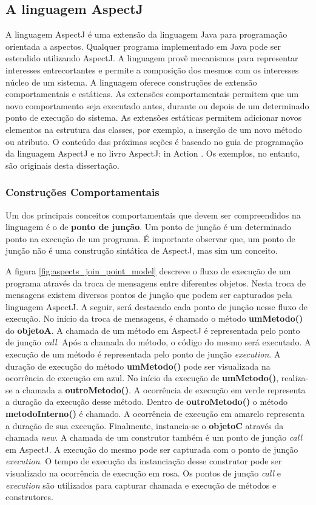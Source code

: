 \subsection{A linguagem AspectJ}

A linguagem AspectJ \cite{AspectJ11} é uma extensão da linguagem Java para programação orientada a aspectos. Qualquer programa implementado em Java
pode ser estendido utilizando AspectJ. A linguagem provê mecanismos para representar interesses entrecortantes e permite a composição dos mesmos com os interesses 
núcleo de um sistema. A linguagem oferece construções de extensão comportamentais e estáticas. As extensões comportamentais permitem que um novo
comportamento seja executado antes, durante ou depois de um determinado ponto de execução do sistema. As extensões estáticas permitem adicionar novos elementos na
estrutura das classes, por exemplo, a inserção de um novo método ou atributo. O conteúdo das próximas seções é baseado no guia de programação da
linguagem AspectJ \cite{aspectjguide} e no livro AspectJ: in Action \cite{Laddad:2003:AAP:993468}. Os exemplos, no entanto, são originais desta
dissertação.

\subsubsection{Construções Comportamentais}

Um dos principais conceitos comportamentais que devem ser compreendidos na linguagem é o de \textbf{ponto de junção}. Um ponto de junção é um
determinado ponto na execução de um programa. É importante observar que, um ponto de junção não é uma construção sintática de AspectJ, mas sim um conceito. 

A figura \ref{fig:aspects_join_point_model} descreve o fluxo de execução de um programa através da troca de mensagens entre diferentes objetos. Nesta
troca de mensagens existem diversos pontos de junção que podem ser capturados pela linguagem AspectJ. A seguir, será destacado cada ponto de junção
nesse fluxo de execução. No início da troca de mensagens, é chamado o método \textbf{umMetodo()} do \textbf{objetoA}. A chamada de um método em
AspectJ é representada pelo ponto de junção \textit{call}. Após a chamada do método, o código do mesmo será executado. A execução de um método é
representada pelo ponto de junção \textit{execution}. A duração de execução do método \textbf{umMetodo()} pode ser visualizada na ocorrência de
execução em azul. No início da execução de \textbf{umMetodo()}, realiza-se a chamada a \textbf{outroMetodo()}. A ocorrência de execução em verde
representa a duração da execução desse método. Dentro de \textbf{outroMetodo()} o método \textbf{metodoInterno()} é chamado. A ocorrência de execução em 
amarelo representa a duração de sua execução. Finalmente, instancia-se o \textbf{objetoC} através da chamada \textit{new}. A chamada de um construtor
também é um ponto de junção \textit{call} em AspectJ. A execução do mesmo pode ser capturada com o ponto de junção \textit{execution}. O tempo de
execução da instanciação desse construtor pode ser visualizado na ocorrência de execução em rosa. Os pontos de junção \textit{call} e
\textit{execution} são utilizados para capturar chamada e execução de métodos e construtores. 


